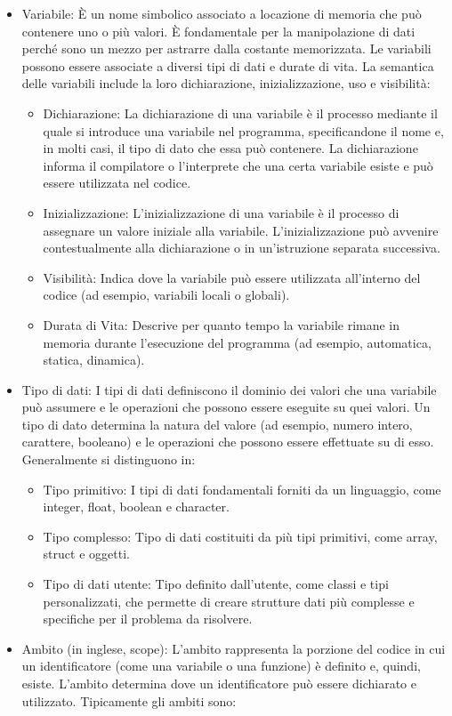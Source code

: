 \documentclass[
  letterpaper,
  DIV=11,
  numbers=noendperiod]{scrreprt}
\providecommand{\tightlist}{%
  \setlength{\itemsep}{0pt}\setlength{\parskip}{0pt}}\usepackage{longtable,booktabs,array}
\begin{document}
\begin{itemize}
\tightlist
\item
  Variabile: È un nome simbolico associato a locazione di memoria che
  può contenere uno o più valori. È fondamentale per la manipolazione di
  dati perché sono un mezzo per astrarre dalla costante memorizzata. Le
  variabili possono essere associate a diversi tipi di dati e durate di
  vita. La semantica delle variabili include la loro dichiarazione,
  inizializzazione, uso e visibilità:

  \begin{itemize}
  \tightlist
  \item
    Dichiarazione: La dichiarazione di una variabile è il processo
    mediante il quale si introduce una variabile nel programma,
    specificandone il nome e, in molti casi, il tipo di dato che essa
    può contenere. La dichiarazione informa il compilatore o
    l'interprete che una certa variabile esiste e può essere utilizzata
    nel codice.
  \item
    Inizializzazione: L'inizializzazione di una variabile è il processo
    di assegnare un valore iniziale alla variabile. L'inizializzazione
    può avvenire contestualmente alla dichiarazione o in un'istruzione
    separata successiva.
  \item
    Visibilità: Indica dove la variabile può essere utilizzata
    all'interno del codice (ad esempio, variabili locali o globali).
  \item
    Durata di Vita: Descrive per quanto tempo la variabile rimane in
    memoria durante l'esecuzione del programma (ad esempio, automatica,
    statica, dinamica).
  \end{itemize}
\item
  Tipo di dati: I tipi di dati definiscono il dominio dei valori che una
  variabile può assumere e le operazioni che possono essere eseguite su
  quei valori. Un tipo di dato determina la natura del valore (ad
  esempio, numero intero, carattere, booleano) e le operazioni che
  possono essere effettuate su di esso. Generalmente si distinguono in:

  \begin{itemize}
  \tightlist
  \item
    Tipo primitivo: I tipi di dati fondamentali forniti da un
    linguaggio, come integer, float, boolean e character.
  \item
    Tipo complesso: Tipo di dati costituiti da più tipi primitivi, come
    array, struct e oggetti.
  \item
    Tipo di dati utente: Tipo definito dall'utente, come classi e tipi
    personalizzati, che permette di creare strutture dati più complesse
    e specifiche per il problema da risolvere.
  \end{itemize}
\item
  Ambito (in inglese, scope): L'ambito rappresenta la porzione del
  codice in cui un identificatore (come una variabile o una funzione) è
  definito e, quindi, esiste. L'ambito determina dove un identificatore
  può essere dichiarato e utilizzato. Tipicamente gli ambiti sono:


\end{itemize}
\end{document}
